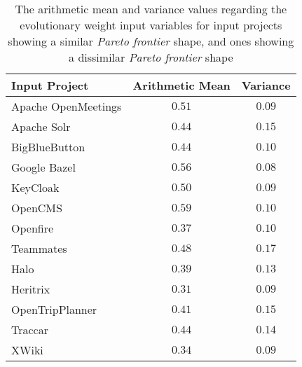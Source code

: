 \documentclass[12pt,a4paper]{report}
\begin{document}
\begin{table}[h!]
\def\arraystretch{1.55}
\begin{tabularx}{\textwidth}{|X|c|c|}
\hline
Input Project & Arithmetic Mean & Variance \\
\hline\hline

Apache OpenMeetings & $0.51$ & $0.09$ \\\hline
Apache Solr         & $0.44$ & $0.15$ \\\hline
BigBlueButton       & $0.44$ & $0.10$ \\\hline
Google Bazel        & $0.56$ & $0.08$ \\\hline
KeyCloak            & $0.50$ & $0.09$ \\\hline
OpenCMS             & $0.59$ & $0.10$ \\\hline
Openfire            & $0.37$ & $0.10$ \\\hline
Teammates           & $0.48$ & $0.17$ \\\hline
\hline\hline
Halo                & $0.39$ & $0.13$ \\\hline
Heritrix            & $0.31$ & $0.09$ \\\hline
OpenTripPlanner     & $0.41$ & $0.15$ \\\hline
Traccar             & $0.44$ & $0.14$ \\\hline
XWiki               & $0.34$ & $0.09$ \\\hline

\end{tabularx}
\caption{The arithmetic mean and variance values regarding the evolutionary weight input variables for input projects showing a similar \textit{Pareto frontier} shape, and ones showing a dissimilar \textit{Pareto frontier} shape}
\label{table:experiment-4.6}
\end{table}
\end{document}
